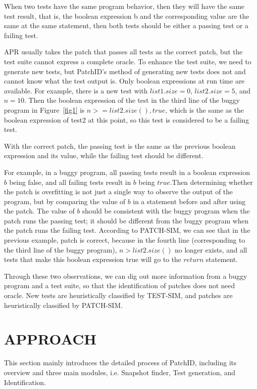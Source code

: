 \begin{definition}
	When two tests have the same program behavior, then they will have the same test result, that is, the boolean expression b and the corresponding value are the same at the same statement, then both tests should be either a passing test or a failing test.  
\end{definition}
APR usually takes the patch that passes all tests as the correct patch, but the test suite cannot express a complete oracle. To enhance the test suite, we need to generate new tests, but PatchID's method of generating new tests does not and cannot know what the test output is. Only boolean expressions at run time are available. For example, there is a new test with $list1.size = 0$, $list 2.size = 5$, and $n = 10$. Then the boolean expression of the test in the third line of the buggy program in Figure~\ref{fig1} is $n > = list2.size(),true$, which is the same as the boolean expression of test2 at this point, so this test is considered to be a failing test.
\begin{definition}
	With the correct patch, the passing test is the same as the previous boolean expression and its value, while the failing test should be different. 
\end{definition}
For example, in a buggy program, all passing tests result in a boolean expression $b$ being false, and all failing tests result in $b$ being $true$.Then determining whether the patch is overfitting is not just a single way to observe the output of the program, but by comparing the value of $b$ in a statement before and after using the patch. The value of $b$ should be consistent with the buggy program when the patch runs the passing test; it should be different from the buggy program when the patch runs the failing test. According to PATCH-SIM, we can see that in the previous example, patch is correct, because in the fourth line (corresponding to the third line of the buggy program), $n > list 2.size()$ no longer exists, and all tests that make this boolean expression true will go to the $return$ statement.

Through these two observations, we can dig out more information from a buggy program and a test suite, so that the identification of patches does not need oracle. New tests are heuristically classified by TEST-SIM, and patches are heuristically classified by PATCH-SIM.

\section{APPROACH}\label{4}
This section mainly introduces the detailed process of PatchID, including its overview and three main modules, i.e. Snapshot finder, Test generation, and Identification.

